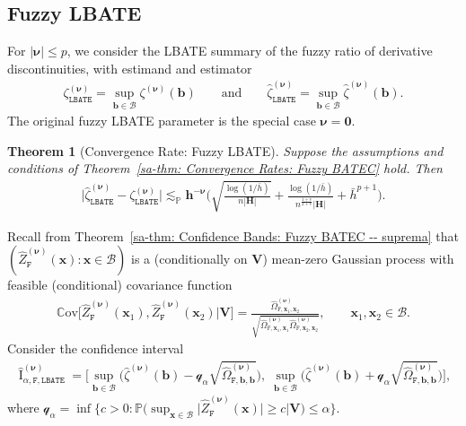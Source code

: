 \documentclass[10pt]{article}
\newtheorem{thm}{Theorem}
\DeclareMathOperator{\CI}{I}
\renewcommand{\P}{\mathbb{P}}
\newcommand{\Cov}{\mathbb{C}\mathrm{ov}}
\newcommand{\lessp}{\lesssim_{\mathbb{P}}}
\newcommand{\bb}{\mathbf{b}}
\newcommand{\bh}{\mathbf{h}}
\newcommand{\bH}{\mathbf{H}}
\newcommand{\bV}{\mathbf{V}}
\newcommand{\bx}{\mathbf{x}}
\newcommand{\bnu}{\boldsymbol{\nu}}
\newcommand{\B}{\mathcal{B}}
\newcommand{\q}{\mathcal{q}}
\begin{document}
\subsection{Fuzzy LBATE}

For $|\bnu|\leq p$, we consider the LBATE summary of the fuzzy ratio of derivative discontinuities, with estimand and estimator
\begin{align*}
    \zeta_{\mathtt{LBATE}}^{(\bnu)} = \sup_{\bb \in \B} \zeta^{(\bnu)}(\bb)
    \qquad\text{and}\qquad
    \widehat{\zeta}_{\mathtt{LBATE}}^{(\bnu)} = \sup_{\bb \in \B} \widehat{\zeta}^{(\bnu)}(\bb).
\end{align*}
The original fuzzy LBATE parameter is the special case $\bnu=\mathbf{0}$.

\begin{thm}[Convergence Rate: Fuzzy LBATE]\label{sa-thm: Convergence Rate: Fuzzy LBATE}
    Suppose the assumptions and conditions of Theorem~\ref{sa-thm: Convergence Rates: Fuzzy BATEC} hold. Then
    \begin{align*}
        \big|\widehat{\zeta}_{\mathtt{LBATE}}^{(\bnu)} - \zeta_{\mathtt{LBATE}}^{(\bnu)} \big|
        \lessp \bh^{-\bnu}\Big(\sqrt{\frac{\log(1/\bar{h})}{ n |\bH|}} + \frac{\log(1/\bar{h})}{n^{\frac{1+v}{2+v}}|\bH|} + \bar{h}^{p+1}\Big).
    \end{align*}
\end{thm}

Recall from Theorem~\ref{sa-thm: Confidence Bands: Fuzzy BATEC -- suprema} that $(\widehat{Z}_{\mathtt{F}}^{(\bnu)}(\bx):\bx \in \B)$ is a (conditionally on $\bV$) mean-zero Gaussian process with feasible (conditional) covariance function
\begin{align*}
    \Cov \Big[\widehat{Z}_{\mathtt{F}}^{(\bnu)}(\bx_1),\widehat{Z}_{\mathtt{F}}^{(\bnu)}(\bx_2) \Big|\bV \Big]
    = \frac{\widehat{\Omega}_{\mathtt{F},\bx_1,\bx_2}^{(\bnu)}}
           {\sqrt{\widehat{\Omega}_{\mathtt{F},\bx_1,\bx_1}^{(\bnu)} \widehat{\Omega}_{\mathtt{F},\bx_2,\bx_2}^{(\bnu)}}},
    \qquad \bx_1, \bx_2 \in \B.
\end{align*}
Consider the confidence interval
\begin{align*}
    \widehat{\CI}_{\alpha,\mathtt{F,LBATE}}^{(\bnu)}
    =
    \bigg[\sup_{\bb \in \B} \Big(\widehat{\zeta}^{(\bnu)}(\bb)  - \q_{\alpha} \sqrt{\widehat{\Omega}_{\mathtt{F},\bb,\bb}^{(\bnu)}}\Big), \;
    \sup_{\bb \in \B} \Big(\widehat{\zeta}^{(\bnu)}(\bb) + \q_{\alpha} \sqrt{\widehat{\Omega}_{\mathtt{F},\bb,\bb}^{(\bnu)}}\Big)\bigg],
\end{align*}
where $\q_{\alpha} = \inf \big\{c > 0: \P \big(\sup_{\bx \in \B} \big|\widehat{Z}_{\mathtt{F}}^{(\bnu)}(\bx)\big|\geq c \big| \bV \big) \leq \alpha \big\}$.
\end{document}
